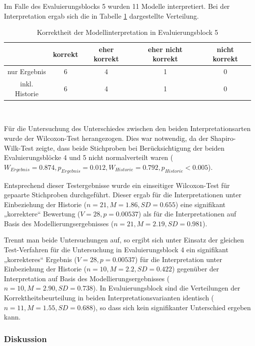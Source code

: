 Im Falle des Evaluierungsblocks 5 wurden 11 Modelle interpretiert. Bei der Interpretation ergab sich die in Tabelle \ref{tab:interpretation_block5} dargestellte Verteilung.

\begin{table}[htbp]
	\centering
	\caption{Korrektheit der Modellinterpretation in Evaluierungsblock 5}
\begin{tabular}{| c || c | c | c | c |}
  \hline
   & korrekt & eher korrekt & eher nicht korrekt & nicht korrekt \\ \hline
   nur Ergebnis   & 6 & 4 & 1 & 0 \\ 
   inkl. Historie & 6 & 4 & 1 & 0 \\ \hline
\end{tabular} \\
	\label{tab:interpretation_block5}
\end{table}

Für die Untersuchung des Unterschiedes zwischen den beiden Interpretationsarten wurde der Wilcoxon-Test herangezogen. Dies war notwendig, da der Shapiro-Wilk-Test zeigte, dass beide Stichproben bei Berücksichtigung der beiden Evaluierungsblöcke 4 und 5 nicht normalverteilt waren ($W_{Ergebnis}=0.874, p_{Ergebnis}=0.012, W_{Historie}=0.792, p_{Historie}<0.005$).

Entsprechend dieser Testergebnisse wurde ein einseitiger Wilcoxon-Test für gepaarte Stichproben durchgeführt. Dieser ergab für die Interpretationen unter Einbeziehung der Historie ($n=21, M=1.86, SD=0.655$) eine signifikant „korrektere“ Bewertung ($V=28, p=0.00537$) als für die Interpretationen auf Basis des Modellierungsergebnisses ($n=21, M=2.19, SD=0.981$).

Trennt man beide Untersuchungen auf, so ergibt sich unter Einsatz der gleichen Test-Verfahren für die Untersuchung in Evaluierungsblock 4 ein signifikant „korrekteres“ Ergebnis ($V=28, p=0.00537$) für die Interpretation unter Einbeziehung der Historie ($n=10, M=2.2, SD=0.422$) gegenüber der Interpretation auf Basis des Modellierungsergebnisses ($n=10, M=2.90, SD=0.738$). In Evaluierungsblock sind die Verteilungen der Korrektheitsbeurteilung in beiden Interpretationsvarianten identisch ($n=11, M=1.55, SD=0.688$), so dass sich kein signifikanter Unterschied ergeben kann.

\subsubsection{Diskussion} 

